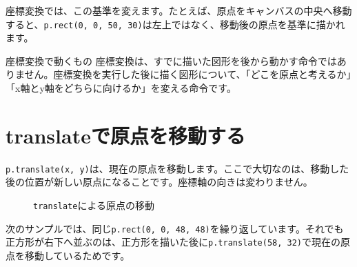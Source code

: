 座標変換では、この基準を変えます。たとえば、原点をキャンバスの中央へ移動すると、\texttt{p.rect(0, 0, 50, 30)}は左上ではなく、移動後の原点を基準に描かれます。

\begin{pointbox}{座標変換で動くもの}
座標変換は、すでに描いた図形を後から動かす命令ではありません。座標変換を実行した後に描く図形について、「どこを原点と考えるか」「x軸とy軸をどちらに向けるか」を変える命令です。
\end{pointbox}

\section{translateで原点を移動する}

\texttt{p.translate(x, y)}は、現在の原点を移動します。ここで大切なのは、移動した後の位置が新しい原点になることです。座標軸の向きは変わりません。

\begin{figure}[htbp]
    \centering
    \caption{\texttt{translate}による原点の移動}
    \label{fig:chapter09-translate-axis}
\end{figure}

次のサンプルでは、同じ\texttt{p.rect(0, 0, 48, 48)}を繰り返しています。それでも正方形が右下へ並ぶのは、正方形を描いた後に\texttt{p.translate(58, 32)}で現在の原点を移動しているためです。

\begin{listing}[htbp]
\inputminted{ts}{typescript-p5/listings/chapter09/translated-squares.ts}
\caption{\texttt{translate}で原点を移動しながら正方形を描く（\texttt{chapter09/translated-squares.ts}）}
\label{lst:chapter09-translated-squares}
\end{listing}

